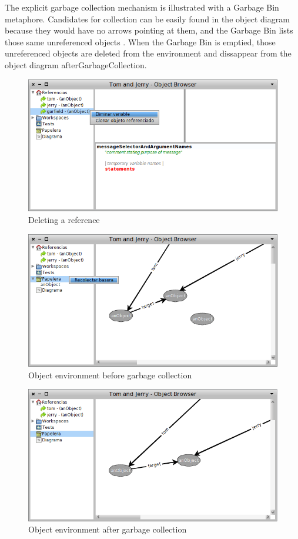 \documentclass{sigplanconf}
\begin{document}
The explicit garbage collection mechanism is illustrated with a Garbage Bin metaphore. Candidates for collection can be easily found in the object diagram because they would have no arrows pointing at them, and the Garbage Bin lists those same unreferenced objects . When the Garbage Bin is emptied, those unreferenced objects are deleted from the environment and dissappear from the object diagram  {afterGarbageCollection}.
\begin{figure}[h]
 \centering
 \includegraphics[scale=.35]{./images/deletingAReference.png}
 \caption{Deleting a reference}
 \label{fig:deletingAReference}
\end{figure}
\begin{figure}[h]
 \centering
 \includegraphics[scale=.35]{./images/beforeGarbageCollection.png}
 \caption{Object environment before garbage collection}
 \label{fig:beforeGarbageCollection}
\end{figure}
\begin{figure}[h]
 \centering
 \includegraphics[scale=.35]{./images/afterGarbageCollection.png}
 \caption{Object environment after garbage collection}
 \label{fig:afterGarbageCollection}
\end{figure}
\end{document}
